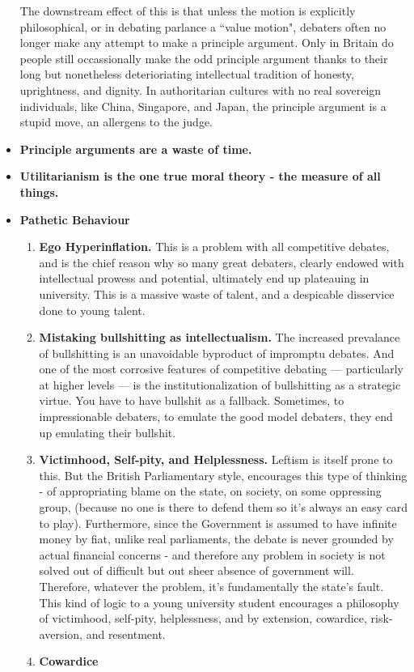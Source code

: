 \begin{itemize}
    The downstream effect of this is that unless the motion is explicitly philosophical, or in debating parlance a “value motion", debaters often no longer make any attempt to make a principle argument. Only in Britain do people still occassionally make the odd principle argument thanks to their long but nonetheless deterioriating intellectual tradition of honesty, uprightness, and dignity. In authoritarian cultures with no real sovereign individuals, like China, Singapore, and Japan, the principle argument is a stupid move, an allergens to the judge.

    \item \textbf{Principle arguments are a waste of time.}
    \item \textbf{Utilitarianism is the one true moral theory - the measure of all things.}
    \item \textbf{Pathetic Behaviour } 
        \begin{enumerate}
            \item \textbf{Ego Hyperinflation.} This is a problem with all competitive debates, and is the chief reason why so many great debaters, clearly endowed with intellectual prowess and potential, ultimately end up plateauing in university. This is a massive waste of talent, and a despicable disservice done to young talent. 
            \item \textbf{Mistaking bullshitting as intellectualism.} The increased prevalance of bullshitting is an unavoidable byproduct of impromptu debates. And one of the most corrosive features of competitive debating — particularly at higher levels — is the institutionalization of bullshitting as a strategic virtue. You have to have bullshit as a fallback. Sometimes, to impressionable debaters, to emulate the good model debaters, they end up emulating their bullshit.
            
            \item \textbf{Victimhood, Self-pity, and Helplessness.} Leftism is itself prone to this. But the British Parliamentary style, encourages this type of thinking - of appropriating blame on the state, on society, on some oppressing group, (because no one is there to defend them so it's always an easy card to play). Furthermore, since the Government is assumed to have infinite money by fiat, unlike real parliaments, the debate is never grounded by actual financial concerns - and therefore any problem in society is not solved out of difficult but out sheer absence of government will. Therefore, whatever the problem, it's fundamentally the state's fault. This kind of logic to a young university student encourages a philosophy of victimhood, self-pity, helplessness, and by extension, cowardice, risk-aversion, and resentment.
            \item \textbf{Cowardice}
            

\end{enumerate}
\end{itemize}
